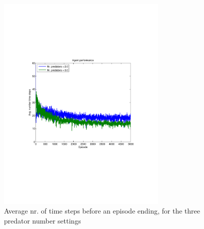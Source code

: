 \begin{figure}[hbt]
\centering
\includegraphics[bb = 0.6in 3in 7.9in 8in,clip,width=0.73\textwidth]{IQLnrTimeSteps5000episodesavg200trials.pdf} 
\caption{Average nr. of time steps before an episode ending, for the three predator number settings}
\label{fig:IQLnrTimeSteps2}
\end{figure}


\clearpage
